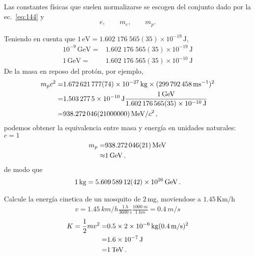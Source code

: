 Las constantes físicas que suelen normalizarse se escogen del conjunto dado por la ec.~\eqref{eq:144} y
\begin{equation}
  \label{eq:145}
  e,\qquad m_e,\qquad m_p.
\end{equation}
\begin{frame}
Teniendo en cuenta que $1\,\text{eV}=1.602\;176\;565(35)\times10^{-19}\,\text{J}$,
\begin{align}
  10^{-9}\,\text{GeV}=&1.602\;176\;565(35)\times10^{-19}\,\text{J}\nonumber\\
  1\,\text{GeV}=&1.602\;176\;565(35)\times10^{-10}\,\text{J}
\end{align}
De la masa en reposo del protón, por ejemplo, 
\begin{align*}
  m_pc^2=&\SI{1.672621777 +- 0.000000074E-27}{kg}\times (\SI{299792458}{ms^{-1}})^2\nonumber\\
  =&\SI{1.5032775e-10}{J}\frac{\SI{1}{GeV}}{\SI{1.602176565 +- .000000035E-10}{J}}\nonumber\\
  =&\SI{938.272046+-21}{MeV}/c^2\,,
\end{align*}
podemos obtener la equivalencia entre masa y energía en unidades naturales: $c=1$
\begin{align}
m_p=&\SI{938.272046+-0.000021}{MeV}\nonumber\\
  \approx& \SI{1}{GeV}\,.
\end{align}
de modo que
\begin{align}
  \SI{1}{kg}=\SI{5.60958912 +- 0.00000042E26}{GeV}\,.
\end{align}

\begin{example}
  Calcule la energía cinetica de un mosquito de $2\,$mg, moviendose a $1.45\,$Km/h
  \begin{align}
    v= \SI{1.45}{km/h}\frac{\SI{1}{h}}{\SI{3600}{s}}\frac{\SI{1000}{m}}{\SI{1}{km}}=\SI{0.4}{m/s}  
\end{align}
\begin{align}
  K=\frac{1}{2}mv^2=&0.5\times \SI{2E-6}{kg}(\SI{0.4}{m/s})^2 \nonumber\\
                   =&\SI{1.6E-7}{J}\nonumber\\
                   =&\SI{1}{TeV}\,.
\end{align}

\end{example}


\end{frame}
